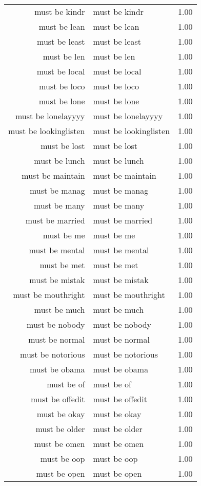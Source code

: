 \begin{table}[ht]
\begin{tabular}{rlr}
  must be kindr & must be kindr & 1.00 \\ 
  must be lean & must be lean & 1.00 \\ 
  must be least & must be least & 1.00 \\ 
  must be len & must be len & 1.00 \\ 
  must be local & must be local & 1.00 \\ 
  must be loco & must be loco & 1.00 \\ 
  must be lone & must be lone & 1.00 \\ 
  must be lonelayyyy & must be lonelayyyy & 1.00 \\ 
  must be lookinglisten & must be lookinglisten & 1.00 \\ 
  must be lost & must be lost & 1.00 \\ 
  must be lunch & must be lunch & 1.00 \\ 
  must be maintain & must be maintain & 1.00 \\ 
  must be manag & must be manag & 1.00 \\ 
  must be many & must be many & 1.00 \\ 
  must be married & must be married & 1.00 \\ 
  must be me & must be me & 1.00 \\ 
  must be mental & must be mental & 1.00 \\ 
  must be met & must be met & 1.00 \\ 
  must be mistak & must be mistak & 1.00 \\ 
  must be mouthright & must be mouthright & 1.00 \\ 
  must be much & must be much & 1.00 \\ 
  must be nobody & must be nobody & 1.00 \\ 
  must be normal & must be normal & 1.00 \\ 
  must be notorious & must be notorious & 1.00 \\ 
  must be obama & must be obama & 1.00 \\ 
  must be of & must be of & 1.00 \\ 
  must be offedit & must be offedit & 1.00 \\ 
  must be okay & must be okay & 1.00 \\ 
  must be older & must be older & 1.00 \\ 
  must be omen & must be omen & 1.00 \\ 
  must be oop & must be oop & 1.00 \\ 
  must be open & must be open & 1.00 \\ 

\end{tabular}
\end{table}

